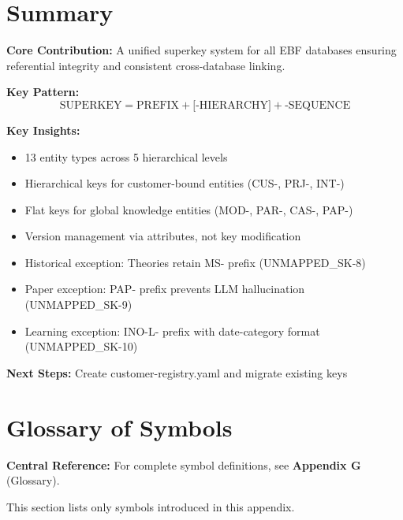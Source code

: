\section{Summary}
\label{sec:superkey-summary}

\begin{tcolorbox}[colback=gray!5!white, colframe=gray!75!black,
    title=Appendix UNMAPPED_BN Summary: Superkey Specification]

\textbf{Core Contribution:}
A unified superkey system for all EBF databases ensuring referential integrity
and consistent cross-database linking.

\textbf{Key Pattern:}
\begin{equation}
\text{SUPERKEY} = \text{PREFIX} + \text{[-HIERARCHY]} + \text{-SEQUENCE}
\end{equation}

\textbf{Key Insights:}
\begin{itemize}[nosep]
\item 13 entity types across 5 hierarchical levels
\item Hierarchical keys for customer-bound entities (CUS-, PRJ-, INT-)
\item Flat keys for global knowledge entities (MOD-, PAR-, CAS-, PAP-)
\item Version management via attributes, not key modification
\item Historical exception: Theories retain MS- prefix (UNMAPPED_SK-8)
\item Paper exception: PAP- prefix prevents LLM hallucination (UNMAPPED_SK-9)
\item Learning exception: INO-L- prefix with date-category format (UNMAPPED_SK-10)
\end{itemize}

\textbf{Next Steps:} Create customer-registry.yaml and migrate existing keys
\end{tcolorbox}


\section{Glossary of Symbols}
\label{sec:superkey-glossary}

\begin{tcolorbox}[colback=blue!5!white, colframe=blue!75!black]
\textbf{Central Reference:} For complete symbol definitions, see
\textbf{Appendix G} (Glossary).

This section lists only symbols introduced in this appendix.
\end{tcolorbox}

